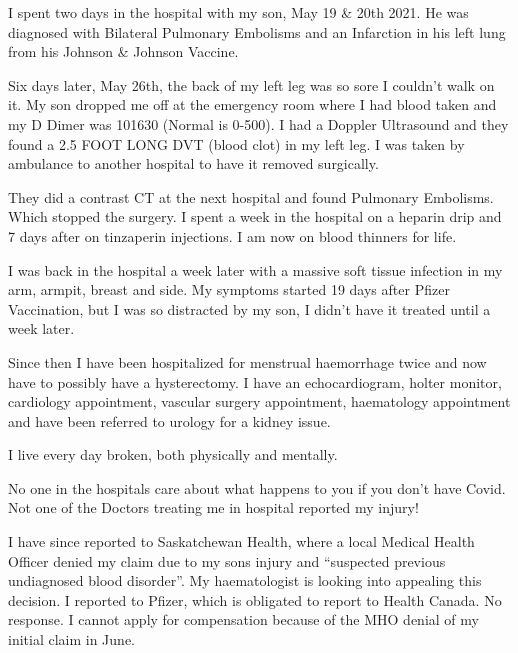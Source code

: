 
I spent two days in the hospital with my son, May 19 \& 20th 2021. He was
diagnosed with Bilateral Pulmonary Embolisms and an Infarction in his left lung
from his Johnson \& Johnson Vaccine.

Six days later, May 26th, the back of my left leg was so sore I couldn’t walk on
it. My son dropped me off at the emergency room where I had blood taken and my D
Dimer was 101630 (Normal is 0-500). I had a Doppler Ultrasound and they found a
2.5 FOOT LONG DVT (blood clot) in my left leg. I was taken by ambulance to
another hospital to have it removed surgically.

They did a contrast CT at the next hospital and found Pulmonary Embolisms. Which
stopped the surgery. I spent a week in the hospital on a heparin drip and 7 days
after on tinzaperin injections. I am now on blood thinners for life.

I was back in the hospital a week later with a massive soft tissue infection in
my arm, armpit, breast and side. My symptoms started 19 days after Pfizer
Vaccination, but I was so distracted by my son, I didn’t have it treated until a
week later.

Since then I have been hospitalized for menstrual haemorrhage twice and now have
to possibly have a hysterectomy. I have an echocardiogram, holter monitor,
cardiology appointment, vascular surgery appointment, haematology appointment
and have been referred to urology for a kidney issue.

I live every day broken, both physically and mentally.

No one in the hospitals care about what happens to you if you don’t have
Covid. Not one of the Doctors treating me in hospital reported my injury!

I have since reported to Saskatchewan Health, where a local Medical Health
Officer denied my claim due to my sons injury and “suspected previous
undiagnosed blood disorder”. My haematologist is looking into appealing this
decision. I reported to Pfizer, which is obligated to report to Health
Canada. No response. I cannot apply for compensation because of the MHO denial
of my initial claim in June.
